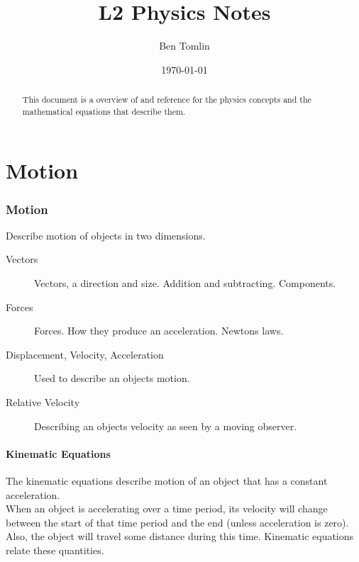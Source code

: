 \documentclass[11pt,a4paper]{article}
\date{\today}
\title{L2 Physics Notes}
\author{Ben Tomlin}
\begin{document}
\maketitle

\begin{abstract}
This document is a overview of and reference for the physics concepts and the mathematical equations that describe them. 
\end{abstract}


\tableofcontents

\part{Motion}

\section{Motion}
Describe motion of objects in two dimensions.

\begin{description}
	\item[Vectors] Vectors, a direction and size. Addition and subtracting. Components.
	\item[Forces] Forces. How they produce an acceleration. Newtons laws.
	\item[Displacement, Velocity, Acceleration] Used to describe an objects motion.
	\item[Relative Velocity] Describing an objects velocity as seen by a moving observer. 
\end{description}

\subsection{Kinematic Equations}
The kinematic equations describe motion of an object that has a constant acceleration. \\


When an object is accelerating over a time period, its velocity will change between the start of that time period and
the end (unless acceleration is zero). Also, the object will travel some distance during this time. Kinematic
equations relate these quantities. \\
\end{document}
